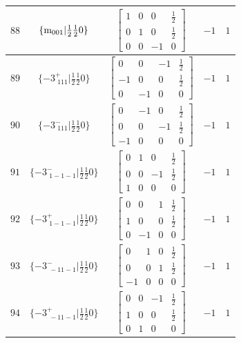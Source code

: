 \documentclass[fleqn,8pt]{jsarticle}
\begin{document}
\begin{longtable}{ccccc}
$ 88 $ & $ \{{\rm m}_{001}|\frac{1}{2} \frac{1}{2} 0\} $ & $ \begin{bmatrix} 1 & 0 & 0 & \frac{1}{2} \\ 0 & 1 & 0 & \frac{1}{2} \\ 0 & 0 & -1 & 0 \end{bmatrix} $ & $ -1 $ & $ 1 $ \\ \hline
$ 89 $ & $ \{-3^{+}_{\,\,111}|\frac{1}{2} \frac{1}{2} 0\} $ & $ \begin{bmatrix} 0 & 0 & -1 & \frac{1}{2} \\ -1 & 0 & 0 & \frac{1}{2} \\ 0 & -1 & 0 & 0 \end{bmatrix} $ & $ -1 $ & $ 1 $ \\ \hline
$ 90 $ & $ \{-3^{-}_{\,\,111}|\frac{1}{2} \frac{1}{2} 0\} $ & $ \begin{bmatrix} 0 & -1 & 0 & \frac{1}{2} \\ 0 & 0 & -1 & \frac{1}{2} \\ -1 & 0 & 0 & 0 \end{bmatrix} $ & $ -1 $ & $ 1 $ \\ \hline
$ 91 $ & $ \{-3^{-}_{\,\,1-1-1}|\frac{1}{2} \frac{1}{2} 0\} $ & $ \begin{bmatrix} 0 & 1 & 0 & \frac{1}{2} \\ 0 & 0 & -1 & \frac{1}{2} \\ 1 & 0 & 0 & 0 \end{bmatrix} $ & $ -1 $ & $ 1 $ \\ \hline
$ 92 $ & $ \{-3^{+}_{\,\,1-1-1}|\frac{1}{2} \frac{1}{2} 0\} $ & $ \begin{bmatrix} 0 & 0 & 1 & \frac{1}{2} \\ 1 & 0 & 0 & \frac{1}{2} \\ 0 & -1 & 0 & 0 \end{bmatrix} $ & $ -1 $ & $ 1 $ \\ \hline
$ 93 $ & $ \{-3^{-}_{\,\,-11-1}|\frac{1}{2} \frac{1}{2} 0\} $ & $ \begin{bmatrix} 0 & 1 & 0 & \frac{1}{2} \\ 0 & 0 & 1 & \frac{1}{2} \\ -1 & 0 & 0 & 0 \end{bmatrix} $ & $ -1 $ & $ 1 $ \\ \hline
$ 94 $ & $ \{-3^{+}_{\,\,-11-1}|\frac{1}{2} \frac{1}{2} 0\} $ & $ \begin{bmatrix} 0 & 0 & -1 & \frac{1}{2} \\ 1 & 0 & 0 & \frac{1}{2} \\ 0 & 1 & 0 & 0 \end{bmatrix} $ & $ -1 $ & $ 1 $ \\ \hline

\end{longtable}
\end{document}
